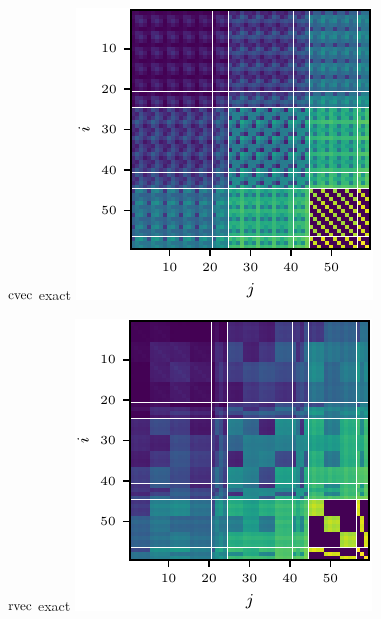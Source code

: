 \begin{figure}
\begin{minipage}[t]{0.495\linewidth}
  \end{minipage}
  \begin{minipage}[t]{0.495\linewidth}
    \centering
    $\operatorname{cvec}$ exact\vspace{1ex}
    \includegraphics[width=0.8\linewidth]{../kfs/plots/synthetic_cvec_ggn.pdf}
  \end{minipage}
  \hfill
  \begin{minipage}[t]{0.495\linewidth}
    \centering
    $\operatorname{rvec}$ exact\vspace{1ex}
    \includegraphics[width=0.8\linewidth]{../kfs/plots/synthetic_rvec_ggn.pdf}
  \end{minipage}

\end{figure}
